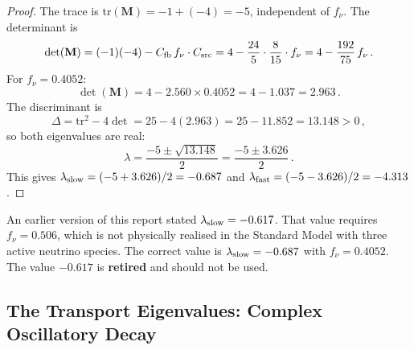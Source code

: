 \begin{proof}
The trace is $\mathrm{tr}(\mathbf{M}) = -1 + (-4) = -5$, independent of $f_\nu$.  The determinant is
\begin{equation}
\det(\mathbf{M}) = (-1)(-4) - C_{\rm fb}\,f_\nu \cdot C_{\rm src} = 4 - \frac{24}{5}\cdot\frac{8}{15}\cdot f_\nu = 4 - \frac{192}{75}\,f_\nu\,.
\end{equation}
For $f_\nu = 0.4052$:
\begin{equation}
\det(\mathbf{M}) = 4 - 2.560 \times 0.4052 = 4 - 1.037 = 2.963\,.
\end{equation}
The discriminant is
\begin{equation}
\Delta = \mathrm{tr}^2 - 4\det = 25 - 4(2.963) = 25 - 11.852 = 13.148 > 0\,,
\end{equation}
so both eigenvalues are real:
\begin{equation}
\lambda = \frac{-5 \pm \sqrt{13.148}}{2} = \frac{-5 \pm 3.626}{2}\,.
\end{equation}
This gives $\lambda_{\rm slow} = (-5 + 3.626)/2 = -0.687$ and $\lambda_{\rm fast} = (-5 - 3.626)/2 = -4.313$.
\end{proof}

\begin{remark}
An earlier version of this report stated $\lambda_{\rm slow} = -0.617$.  That value requires $f_\nu = 0.506$, which is not physically realised in the Standard Model with three active neutrino species.  The correct value is $\lambda_{\rm slow} = -0.687$ with $f_\nu = 0.4052$.  The value $-0.617$ is \textbf{retired} and should not be used.
\end{remark}

\subsection{The Transport Eigenvalues: Complex Oscillatory Decay}

